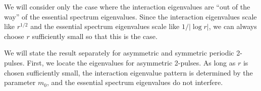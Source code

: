 \documentclass[11pt,reqno]{amsart}
\theoremstyle{plain}
\theoremstyle{definition}
\theoremstyle{remark}
\begin{document}
We will consider only the case where the interaction eigenvalues are ``out of the way'' of the essential spectrum eigenvalues. Since the interaction eigenvalues scale like $r^{1/2}$ and the essential spectrum eigenvalues scale like $1/|\log r|$, we can always choose $r$ sufficiently small so that this is the case. 


We will state the result separately for asymmetric and symmetric periodic 2-pulses. First, we locate the eigenvalues for asymmetric 2-pulses. As long as $r$ is chosen sufficiently small, the interaction eigenvalue pattern is determined by the parameter $m_0$, and the essential spectrum eigenvalues do not interfere.
\end{document}
